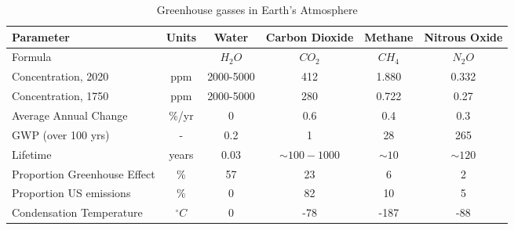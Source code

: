 \documentclass[amstex,12pt]{book}
\begin{document}
\begin{table} 
\centering
\caption{Greenhouse gasses in Earth's Atmosphere}
\label{tab:ghgconcs}
\begin{tabular}{@{}lccccc@{}} \toprule
Parameter				&Units		    &Water		  &Carbon Dioxide		&Methane	&Nitrous Oxide\\ \midrule
Formula					&             &$H_2O$		  &$CO_2$      			&$CH_4$		&$N_2O$\\
Concentration, 2020	  &ppm	  &2000-5000	&412	            &1.880	  &0.332\\
Concentration, 1750	  &ppm	  &2000-5000	&280	            &0.722	  &0.27\\
Average Annual Change	&\%/yr  &0	        &0.6	            &0.4	    &0.3\\
GWP (over 100 yrs)	  &-	    &0.2	      &1	              &28	      &265\\
Lifetime	            &years	&0.03	      &$\sim 100-1000$	&$\sim10$	&$\sim120$\\
Proportion Greenhouse Effect	&\%		&57	  &23	              &6	      &2\\ 
Proportion US emissions	&\%	  &0	        &82	              &10	      &5\\
Condensation Temperature& $^{\circ}C$ &0	  &-78	            &-187	    &-88\\ \bottomrule
\end{tabular}
\end{table}
\end{document}
